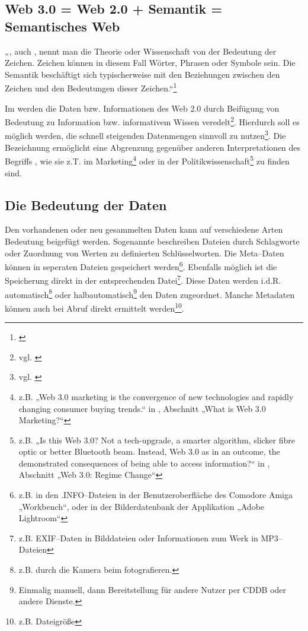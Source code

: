 \subsection{Web 3.0 = Web 2.0 + Semantik = Semantisches Web}

„, auch , nennt man die Theorie oder Wissenschaft von der Bedeutung der Zeichen. Zeichen können in diesem Fall Wörter, Phrasen oder Symbole sein. Die Semantik beschäftigt sich typischerweise mit den Beziehungen zwischen den Zeichen und den Bedeutungen dieser Zeichen.“\footnote{\cite{wp:semantik}}

Im  werden die Daten bzw. Informationen des Web 2.0 durch Beifügung von Bedeutung zu Information bzw. informativem Wissen veredelt\footnote{vgl. \cite{nyt:markoff}}. Hierdurch soll es möglich werden, die schnell steigenden Datenmengen sinnvoll zu nutzen\footnote{vgl. \cite{tsp:tolksdorf}}. Die Bezeichnung  ermöglicht eine Abgrenzung gegenüber anderen Interpretationen des Begriffs , wie sie z.T. im Marketing\footnote{z.B. „Web 3.0 marketing is the convergence of new technologies and rapidly changing consumer buying trends.“ in \cite{web3market}, Abschnitt „What is Web 3.0 Marketing?“} oder in der Politikwissenschaft\footnote{z.B. „Is this Web 3.0? Not a tech-upgrade, a smarter algorithm, slicker fibre optic or better Bluetooth beam. Instead, Web 3.0 as in an outcome, the demonstrated consequences of being able to access information?“ in \cite{web3pol}, Abschnitt „Web 3.0: Regime Change“} zu finden sind.

\subsection{Die Bedeutung der Daten}

Den vorhandenen oder neu gesammelten Daten kann auf verschiedene Arten Bedeutung beigefügt werden. Sogenannte  beschreiben Dateien durch Schlagworte oder Zuordnung von Werten zu definierten Schlüsselworten. Die Meta--Daten können in seperaten Dateien gespeichert werden\footnote{z.B. in den .INFO--Dateien in der Benutzeroberfläche des Comodore Amiga „Workbench“, oder in der Bilderdatenbank der Applikation „Adobe Lightroom“}. Ebenfalls möglich ist die Speicherung direkt in der entsprechenden Datei\footnote{z.B. EXIF--Daten in Bilddateien oder Informationen zum Werk in MP3--Dateien}. Diese Daten werden i.d.R. automatisch\footnote{z.B. durch die Kamera beim fotografieren.} oder halbautomatisch\footnote{Einmalig manuell, dann Bereitstellung für andere Nutzer per CDDB oder andere Dienste.} den Daten zugeordnet. Manche Metadaten können auch bei Abruf direkt ermittelt werden\footnote{z.B. Dateigröße}.

